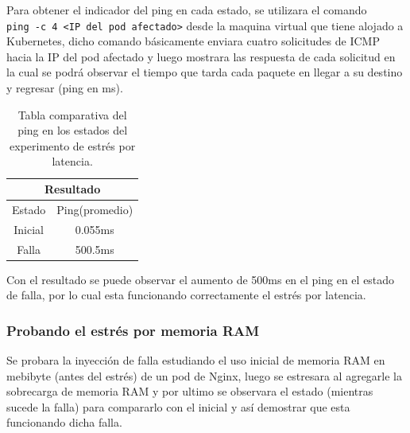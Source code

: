 \par Para obtener el indicador del ping en cada estado, se utilizara el comando \\ \verb|ping -c 4 <IP del pod afectado>| desde la maquina virtual que tiene alojado a Kubernetes, dicho comando básicamente enviara cuatro solicitudes de ICMP hacia la IP del pod afectado y luego mostrara las respuesta de cada solicitud en la cual se podrá observar el tiempo que tarda cada paquete en llegar a su destino y regresar (ping en ms).\\
\begin{table}[ht!]
\begin{center}
\begin{tabular}{ |c|c| } 
 \hline
 \multicolumn{2}{|c|}{Resultado} \\
 \hline
 \hline
 Estado & Ping(promedio)\\
 \hline
 Inicial & 0.055ms\\
 Falla & 500.5ms\\
 \hline
\end{tabular}
\end{center}
\caption{Tabla comparativa del ping en los estados del experimento de estrés por latencia.}
\label{tab:tabla42}
\end{table}

\vspace{\baselineskip}
\par Con el resultado se puede observar el aumento de 500ms en el ping en el estado de falla, por lo cual esta funcionando correctamente el estrés por latencia.\\

\subsubsection{Probando el estrés por memoria RAM}


\par Se probara la inyección de falla estudiando el uso inicial de memoria RAM en mebibyte (antes del estrés) de un pod de Nginx, luego se estresara al agregarle la sobrecarga de memoria RAM y por ultimo se observara el estado (mientras sucede la falla) para compararlo con el inicial y así demostrar que esta funcionando dicha falla.\\

